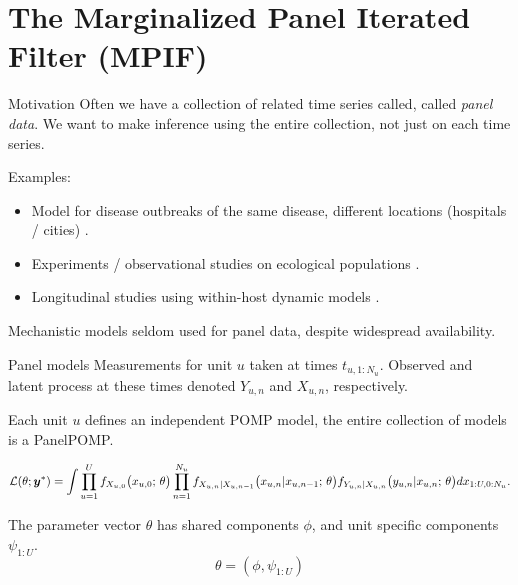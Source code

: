 \documentclass[aspectratio=169]{beamer}\usepackage[]{graphicx}\usepackage[]{xcolor}
\begin{document}
\section{The Marginalized Panel Iterated Filter (MPIF)}

\begin{frame}{Motivation}
Often we have a collection of related time series called, called \emph{panel data}.
We want to make inference using the entire collection, not just on each time series.

Examples:
  \begin{itemize}
    \item Model for disease outbreaks of the same disease, different locations (hospitals / cities) \citep{lee20}.
    \item Experiments / observational studies on ecological populations \citep{searle16}.
    \item Longitudinal studies using within-host dynamic models \citep{ranjeva17}.
  \end{itemize}
  
  Mechanistic models seldom used for panel data, despite widespread availability.
  
\end{frame}

\begin{frame}{Panel models}
  Measurements for unit $u$ taken at times $t_{u, 1:N_u}$. Observed and latent process at these times denoted $Y_{u, n}$ and $X_{u, n}$, respectively.
  
  Each unit $u$ defines an independent POMP model, the entire collection of models is a PanelPOMP.
  
  $$
  \mathcal{L}(\theta; \bm{y}^*) = \int \prod_{u = 1}^U f_{X_{u, 0}}\big(x_{u, 0};\, \theta\big)\prod_{n = 1}^{N_u} f_{X_{u, n}|X_{u, n-1}}\big(x_{u, n}|x_{u, n-1}; \, \theta\big)f_{Y_{u, n}|X_{u, n}}\big(y_{u, n}|x_{u, n}; \, \theta\big) dx_{1:U,0:N_u}.
  $$
  
  The parameter vector $\theta$ has shared components $\phi$, and unit specific components $\psi_{1:U}$.
  $$\theta = (\phi, \psi_{1:U})$$
  
\end{frame}
\end{document}
